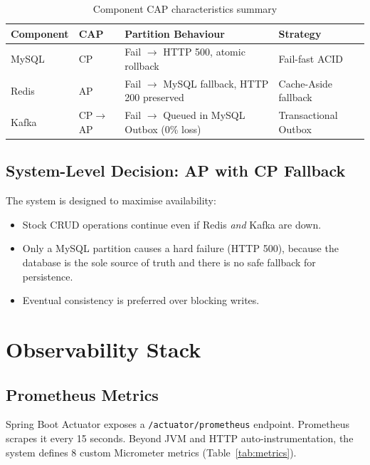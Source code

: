 \documentclass[12pt,a4paper,twoside]{article}
\begin{document}
\begin{table}[H]
\centering
\caption{Component CAP characteristics summary}
\label{tab:cap}
\begin{tabularx}{\textwidth}{@{}llXl@{}}
\toprule
\textbf{Component} & \textbf{CAP} & \textbf{Partition Behaviour} & \textbf{Strategy} \\
\midrule
MySQL  & CP & Fail $\to$ HTTP 500, atomic rollback & Fail-fast ACID \\
Redis  & AP & Fail $\to$ MySQL fallback, HTTP 200 preserved & Cache-Aside fallback \\
Kafka  & CP$\to$AP & Fail $\to$ Queued in MySQL Outbox (0\% loss) & Transactional Outbox \\
\bottomrule
\end{tabularx}
\end{table}

\subsection{System-Level Decision: AP with CP Fallback}

The system is designed to maximise availability:
\begin{itemize}[noitemsep]
  \item Stock CRUD operations continue even if Redis \emph{and} Kafka are down.
  \item Only a MySQL partition causes a hard failure (HTTP 500), because
        the database is the sole source of truth and there is no safe
        fallback for persistence.
  \item Eventual consistency is preferred over blocking writes.
\end{itemize}

\section{Observability Stack}
\label{sec:observability}

\subsection{Prometheus Metrics}

Spring Boot Actuator exposes a \texttt{/actuator/prometheus} endpoint.
Prometheus scrapes it every 15 seconds.
Beyond JVM and HTTP auto-instrumentation, the system defines 8 custom
Micrometer metrics (Table~\ref{tab:metrics}).
\end{document}
